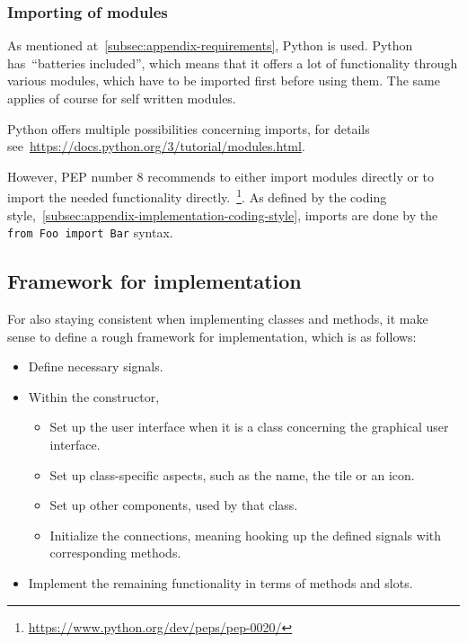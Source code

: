 \documentclass[
    a4paper,      %
    10pt,         %
    openright,    %
    notitlepage,  %
    parskip=half, %
]{scrreprt}       %
\theoremstyle{definition}                    %
\begin{document}
\subsubsection{Importing of modules}
\label{ssubsec:appendix-implementation-coding-style-imports}

As mentioned at~\autoref{subsec:appendix-requirements}, Python is used. Python
has~\enquote{batteries included}, which means that it offers a lot of
functionality through various modules, which have to be imported first before
using them. The same applies of course for self written modules.

Python offers multiple possibilities concerning imports, for details
see~\url{https://docs.python.org/3/tutorial/modules.html}.

However, PEP number 8 recommends to either import modules directly or to import
the needed functionality
directly.~\footnote{\url{https://www.python.org/dev/peps/pep-0020/}}. As defined
by the coding style,~\autoref{subsec:appendix-implementation-coding-style},
imports are done by the \verb+from Foo import Bar+ syntax.

\subsection{Framework for implementation}
\label{subsec:appendix-implementation-framework}

For also staying consistent when implementing classes and methods, it make sense
to define a rough framework for implementation, which is as follows:

\begin{itemize}
\item Define necessary signals.
\item Within the constructor,
  \begin{itemize}
    \item Set up the user interface when it is a class concerning the graphical user interface.
    \item Set up class-specific aspects, such as the name, the tile or an icon.
    \item Set up other components, used by that class.
    \item Initialize the connections, meaning hooking up the defined signals with
      corresponding methods.
  \end{itemize}
\item Implement the remaining functionality in terms of methods and slots.
\end{itemize}
\end{document}
